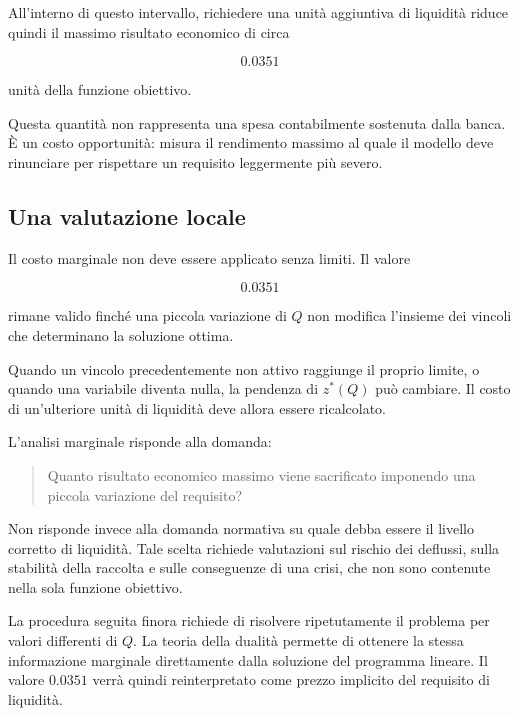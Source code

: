 All'interno di questo intervallo, richiedere una unit\`a aggiuntiva di
liquidit\`a riduce quindi il massimo risultato economico di circa

\[
0.0351
\]

\noindent unit\`a della funzione obiettivo.

Questa quantit\`a non rappresenta una spesa contabilmente sostenuta dalla
banca. \`E un costo opportunit\`a: misura il rendimento massimo al quale il
modello deve rinunciare per rispettare un requisito leggermente pi\`u severo.

\subsection{Una valutazione locale}

Il costo marginale non deve essere applicato senza limiti. Il valore

\[
0.0351
\]

\noindent rimane valido finch\'e una piccola variazione di \(Q\) non modifica l'insieme
dei vincoli che determinano la soluzione ottima.

Quando un vincolo precedentemente non attivo raggiunge il proprio limite, o
quando una variabile diventa nulla, la pendenza di \(z^*(Q)\) pu\`o cambiare.
Il costo di un'ulteriore unit\`a di liquidit\`a deve allora essere
ricalcolato.

\begin{remark}

L'analisi marginale risponde alla domanda:

\begin{quote}
Quanto risultato economico massimo viene sacrificato imponendo una piccola
variazione del requisito?
\end{quote}

Non risponde invece alla domanda normativa su quale debba essere il livello
corretto di liquidit\`a. Tale scelta richiede valutazioni sul rischio dei
deflussi, sulla stabilit\`a della raccolta e sulle conseguenze di una crisi,
che non sono contenute nella sola funzione obiettivo.
\end{remark}

La procedura seguita finora richiede di risolvere ripetutamente il problema
per valori differenti di \(Q\). La teoria della dualit\`a permette di ottenere
la stessa informazione marginale direttamente dalla soluzione del programma
lineare. Il valore \(0.0351\) verr\`a quindi reinterpretato come prezzo
implicito del requisito di liquidit\`a.

